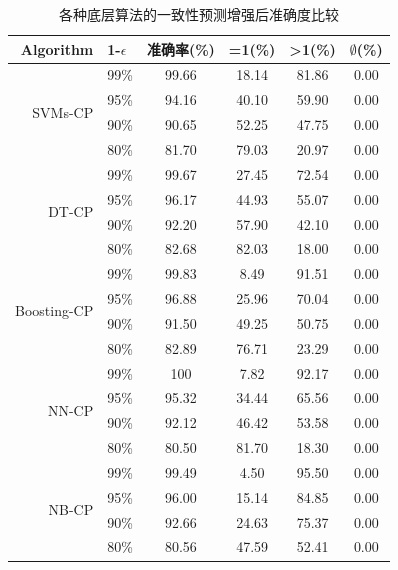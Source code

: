 \begin{table}[]
\centering
\caption{各种底层算法的一致性预测增强后准确度比较}
\label{tab:CP-methods}
\begin{tabular}{@{}rccccc@{}}
\toprule
Algorithm &
  \multicolumn{1}{l}{1-$\epsilon$} &
  \multicolumn{1}{l}{准确率(\%)} &
  \multicolumn{1}{l}{=1(\%)} &
  \multicolumn{1}{l}{\textgreater{}1(\%)} &
  \multicolumn{1}{l}{$\emptyset$(\%)} \\ \midrule
\multirow{4}{*}{SVMs-CP}     & 99\% & 99.66  & 18.14 & 81.86 & 0.00  \\
                          & 95\% & 94.16  & 40.10 & 59.90 & 0.00 \\
                          & 90\% & 90.65  & 52.25 & 47.75 & 0.00 \\
                          & 80\% & 81.70  & 79.03 & 20.97 & 0.00 \\ \midrule
\multirow{4}{*}{DT-CP}       & 99\% & 99.67  & 27.45 & 72.54 & 0.00 \\
                          & 95\% & 96.17  & 44.93 & 55.07 & 0.00 \\
                          & 90\% & 92.20  & 57.90 & 42.10 & 0.00 \\
                          & 80\% & 82.68  & 82.03 & 18.00 & 0.00 \\ \midrule
\multirow{4}{*}{Boosting-CP} & 99\% & 99.83  & 8.49 & 91.51 & 0.00  \\
                          & 95\% & 96.88  & 25.96 & 70.04 & 0.00 \\
                          & 90\% & 91.50  & 49.25 & 50.75 & 0.00 \\
                          & 80\% & 82.89  & 76.71 & 23.29 & 0.00 \\ \midrule
\multirow{4}{*}{NN-CP}       & 99\% & 100  & 7.82 & 92.17 & 0.00 \\
                          & 95\% & 95.32  & 34.44 & 65.56 & 0.00 \\
                          & 90\% & 92.12  & 46.42 & 53.58 & 0.00 \\
                          & 80\% & 80.50  & 81.70 & 18.30 & 0.00 \\ \midrule
\multirow{4}{*}{NB-CP}       & 99\% & 99.49  & 4.50 & 95.50 & 0.00  \\
                          & 95\% & 96.00  & 15.14 & 84.85 & 0.00 \\
                          & 90\% & 92.66  & 24.63 & 75.37 & 0.00 \\
                          & 80\% & 80.56  & 47.59 & 52.41 & 0.00 \\ \midrule

\end{tabular}
\end{table}
